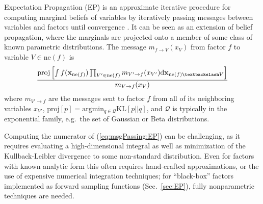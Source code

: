 \documentclass[english]{article}
\theoremstyle{plain}
\theoremstyle{plain}
\newcommand{\bx}{\mathbf{x}}				%
\newcommand{\factor}{f}				%
\newcommand{\outV}{V}                         %
\newcommand{\fis}[1]{\mathrm{ne}(#1)}   	%
\newcommand{\fx}[1]{ \mathbf{x}_{\mathrm{ne}(#1)} }   	%
\newcommand{\xin}{\mathbf{x}_{ \mathrm{in} }} 			%
\newcommand{\xout}{\mathbf{x}_{ \mathrm{out} }}			%
\newcommand{\msg}[2]{m_{#1 \rightarrow #2}}			%
\newcommand{\diffd}{\mathrm{d}}
\newcommand{\projP}[1]{\mathrm{proj} \left [ #1 \right]}
\newcommand{\argmin}[1]{\mathrm{arg}\mathrm{min}_{#1}}
\newcommand{\kld}[2]{\mathrm{KL} \left [ #1 || #2 \right ]}
\begin{document}
Expectation Propagation (EP) is an approximate iterative procedure for computing marginal beliefs of variables
by iteratively passing messages between variables and factors until convergence \citep{Minka2001}.
It can be seen as an extension of belief propagation, where the marginals are projected
onto a member of some class of known parametric distributions. 
The message $\msg{ \factor }{\outV}(x_{\outV})$  from factor $\factor$ to variable $\outV\in\fis{\factor}$ is 
%
\begin{equation}
\frac{ \projP{ 
\int \factor (\fx{\factor}) \prod_{\outV' \in \fis{\factor}} \msg{\outV'}{\factor}(x_{\outV'}) \diffd 
\bx_{\fis{\factor} \textbackslash \outV}} }
{\msg{\outV}{\factor}(x_{\outV})}
%
\label{eq:msgPassing:EP}
\end{equation}
%
where $\msg{\outV'}{\factor}$ are the messages sent to factor $\factor$ from all of its neighboring variables $x_{\outV'}$,
$\projP{p} = \argmin{q \in \mathcal{Q}} \kld{p}{q}$, and $\mathcal{Q}$ is typically in the exponential family, e.g.\ the set of Gaussian or Beta distributions.



Computing the numerator of (\ref{eq:msgPassing:EP}) can be challenging, as it requires evaluating a high-dimensional integral as well as minimization of the Kullback-Leibler divergence to some non-standard distribution. Even for factors with known analytic form this often requires hand-crafted approximations, or the use of expensive numerical integration techniques; for ``black-box'' factors implemented as forward sampling functions (Sec.\ \ref{sec:EP}), fully nonparametric techniques are needed. 

\end{document}
